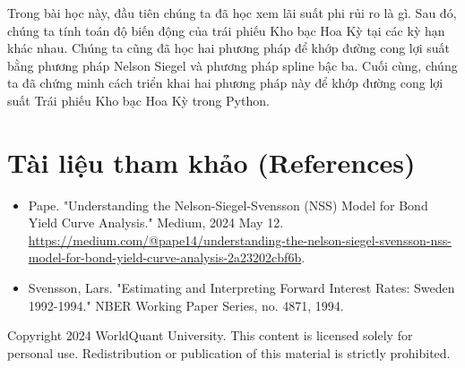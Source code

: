 Trong bài học này, đầu tiên chúng ta đã học xem lãi suất phi rủi ro là gì. Sau đó, chúng ta tính toán độ biến động của trái phiếu Kho bạc Hoa Kỳ tại các kỳ hạn khác nhau. Chúng ta cũng đã học hai phương pháp để khớp đường cong lợi suất bằng phương pháp Nelson Siegel và phương pháp spline bậc ba. Cuối cùng, chúng ta đã chứng minh cách triển khai hai phương pháp này để khớp đường cong lợi suất Trái phiếu Kho bạc Hoa Kỳ trong Python.

\section*{Tài liệu tham khảo (References)}

\begin{itemize}
    \item Pape. "Understanding the Nelson-Siegel-Svensson (NSS) Model for Bond Yield Curve Analysis." Medium, 2024 May 12. \url{https://medium.com/@pape14/understanding-the-nelson-siegel-svensson-nss-model-for-bond-yield-curve-analysis-2a23202cbf6b}.
    \item Svensson, Lars. "Estimating and Interpreting Forward Interest Rates: Sweden 1992-1994." NBER Working Paper Series, no. 4871, 1994.
\end{itemize}

Copyright 2024 WorldQuant University. This content is licensed solely for personal use. Redistribution or publication of this material is strictly prohibited.

